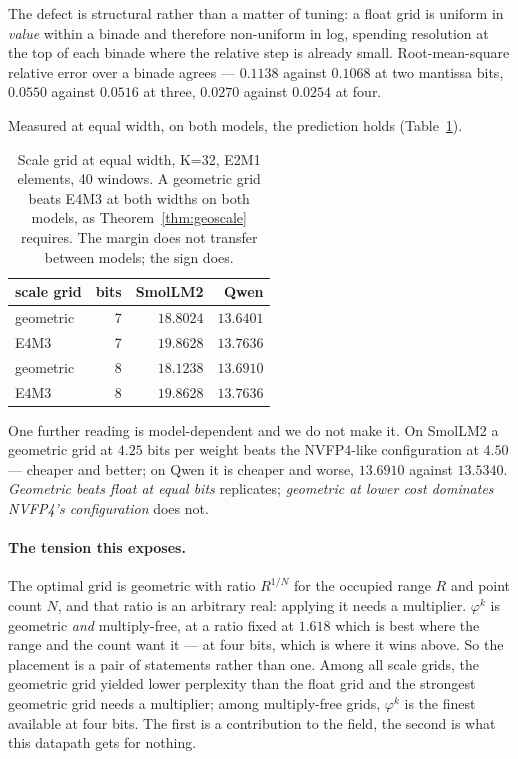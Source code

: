 The defect is structural rather than a matter of tuning: a float grid is uniform
in \emph{value} within a binade and therefore non-uniform in log, spending
resolution at the top of each binade where the relative step is already small.
Root-mean-square relative error over a binade agrees --- $0.1138$ against
$0.1068$ at two mantissa bits, $0.0550$ against $0.0516$ at three, $0.0270$
against $0.0254$ at four.

Measured at equal width, on both models, the prediction holds
(Table~\ref{tab:geoscale}).

\begin{table}[t]\centering
\caption{Scale grid at equal width, K=32, E2M1 elements, 40 windows. A
geometric grid beats E4M3 at both widths on both models, as
Theorem~\ref{thm:geoscale} requires. The margin does not transfer between
models; the sign does.}
\label{tab:geoscale}
\begin{tabular}{lrrr}
\toprule
scale grid & bits & SmolLM2 & Qwen \\
\midrule
geometric & 7 & $\mathbf{18.8024}$ & $\mathbf{13.6401}$ \\
E4M3      & 7 & $19.8628$ & $13.7636$ \\
\addlinespace
geometric & 8 & $\mathbf{18.1238}$ & $\mathbf{13.6910}$ \\
E4M3      & 8 & $19.8628$ & $13.7636$ \\
\bottomrule
\end{tabular}
\end{table}

One further reading is model-dependent and we do not make it. On SmolLM2 a
geometric grid at $4.25$ bits per weight beats the NVFP4-like configuration at
$4.50$ --- cheaper and better; on Qwen it is cheaper and worse, $13.6910$
against $13.5340$. \emph{Geometric beats float at equal bits} replicates;
\emph{geometric at lower cost dominates NVFP4's configuration} does not.

\paragraph{The tension this exposes.} The optimal grid is geometric with ratio
$R^{1/N}$ for the occupied range $R$ and point count $N$, and that ratio is an
arbitrary real: applying it needs a multiplier. $\varphi^{k}$ is geometric
\emph{and} multiply-free, at a ratio fixed at $1.618$ which is best where the
range and the count want it --- at four bits, which is where it wins above. So
the placement is a pair of statements rather than one. Among all scale grids,
the geometric grid yielded lower perplexity than the float grid and the strongest
geometric grid needs a multiplier; among
multiply-free grids, $\varphi^{k}$ is the finest available at four bits. The
first is a contribution to the field, the second is what this datapath gets for
nothing.

